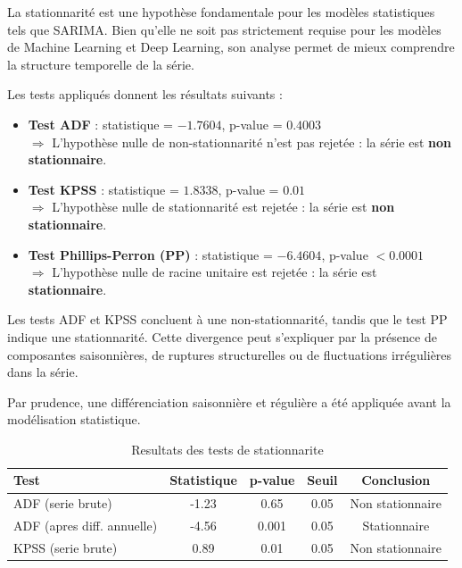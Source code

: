 \documentclass[12pt,a4paper]{report}
\begin{document}
\begin{rq}
La stationnarité est une hypothèse fondamentale pour les modèles
statistiques tels que SARIMA. Bien qu'elle ne soit pas strictement
requise pour les modèles de Machine Learning et Deep Learning, son
analyse permet de mieux comprendre la structure temporelle de la série.

Les tests appliqués donnent les résultats suivants :

\begin{itemize}
    \item \textbf{Test ADF} : statistique = $-1.7604$, 
    p-value = $0.4003$ \\
    $\Rightarrow$ L'hypothèse nulle de non-stationnarité n'est pas rejetée :
    la série est \textbf{non stationnaire}.

    \item \textbf{Test KPSS} : statistique = $1.8338$, 
    p-value = $0.01$ \\
    $\Rightarrow$ L'hypothèse nulle de stationnarité est rejetée :
    la série est \textbf{non stationnaire}.

    \item \textbf{Test Phillips-Perron (PP)} : statistique = $-6.4604$, 
    p-value $< 0.0001$ \\
    $\Rightarrow$ L'hypothèse nulle de racine unitaire est rejetée :
    la série est \textbf{stationnaire}.
\end{itemize}

Les tests ADF et KPSS concluent à une non-stationnarité,
tandis que le test PP indique une stationnarité.
Cette divergence peut s'expliquer par la présence de composantes
saisonnières, de ruptures structurelles ou de fluctuations irrégulières
dans la série.

Par prudence, une différenciation saisonnière et régulière a été
appliquée avant la modélisation statistique.
\end{rq}
\begin{table}[H]
\centering\small\renewcommand{\arraystretch}{1.4}
\begin{tabular}{lcccc}
\toprule
\textbf{Test} & \textbf{Statistique} & \textbf{p-value}
  & \textbf{Seuil} & \textbf{Conclusion} \\
\midrule
ADF (serie brute)         & -1.23 & 0.65 & 0.05 & Non stationnaire \\
ADF (apres diff. annuelle)& -4.56 & 0.001 & 0.05 & Stationnaire \\
KPSS (serie brute)        & 0.89 & 0.01 & 0.05 & Non stationnaire \\
\bottomrule
\end{tabular}
\caption{Resultats des tests de stationnarite}
\label{tab:stationnarite}
\end{table}
\end{document}
